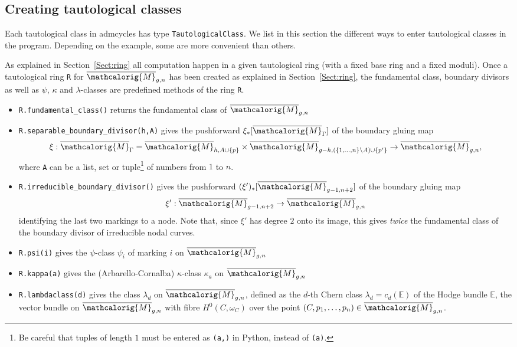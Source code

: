\documentclass[11pt]{article}
\newcommand{\M}{\ensuremath{\overline{\mathcalorig{M}}}}
\begin{document}
\subsection{Creating tautological classes} \label{Sect:entertaut}
Each tautological class in admcycles has type \verb|TautologicalClass|. We list in this section the different ways to enter tautological classes in the program. Depending on the example, some are more convenient than others.

As explained in Section~\ref{Sect:ring} all computation happen in a given tautological ring (with a fixed base ring and a fixed moduli). Once a tautological ring \verb|R| for $\M_{g,n}$ has been created as explained in Section~\ref{Sect:ring}, the fundamental class, boundary divisors as well as $\psi$, $\kappa$ and $\lambda$-classes are predefined methods of the ring \verb|R|.
\begin{itemize}
 \item \verb|R.fundamental_class()| returns the fundamental class of $\M_{g,n}$
 \item \verb|R.separable_boundary_divisor(h,A)| gives the pushforward $\xi_* [\M_\Gamma]$ of the boundary gluing map
 \[\xi : \M_\Gamma = \M_{h,A \cup \{p\}} \times \M_{g-h,(\{1, \ldots, n\} \setminus A) \cup \{p'\}} \to \M_{g,n},\]
 where \verb|A| can be a list, set or tuple\footnote{Be careful that tuples of length $1$ must be entered as \texttt{(a,)} in Python, instead of \texttt{(a)}.} of numbers from $1$ to $n$.
 \item \verb|R.irreducible_boundary_divisor()| gives the pushforward $(\xi')_* [\M_{g-1,n+2}]$ of the boundary gluing map
 \[\xi' : \M_{g-1,n+2} \to \M_{g,n}\]
 identifying the last two markings to a node.  Note that, since $\xi'$ has degree $2$ onto its image, this gives \emph{twice} the fundamental class of the boundary divisor of irreducible nodal curves.
 \item \verb|R.psi(i)| gives the $\psi$-class $\psi_i$ of marking $i$ on $\M_{g,n}$
 \item \verb|R.kappa(a)| gives the (Arbarello-Cornalba) $\kappa$-class $\kappa_a$ on $\M_{g,n}$
 \item \verb|R.lambdaclass(d)| gives the class $\lambda_d$ on $\M_{g,n}$, defined as the $d$-th Chern class $\lambda_d=c_d(\mathbb{E})$ of the Hodge bundle $\mathbb{E}$, the vector bundle on $\M_{g,n}$ with fibre $H^0(C, \omega_C)$ over the point $(C,p_1, \ldots, p_n) \in \M_{g,n}$.
\end{itemize}
\end{document}
